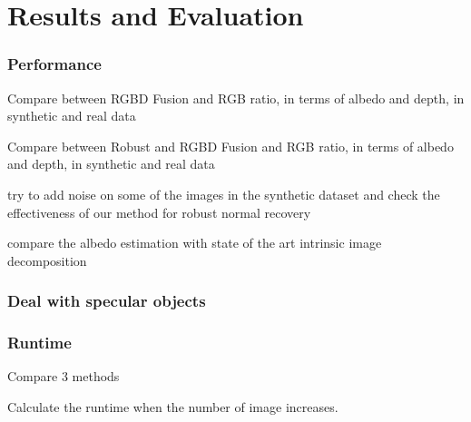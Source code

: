 \chapter{Results and Evaluation} \label{chap:result}


\subsection{Performance}
Compare between RGBD Fusion and RGB ratio, in terms of albedo and depth, in synthetic and real data

Compare between Robust and RGBD Fusion and RGB ratio, in terms of albedo and depth, in synthetic and real data

try to add noise on some of the images in the synthetic dataset and check the effectiveness of our method for robust normal recovery

compare the albedo estimation with state of the art intrinsic image decomposition
\subsection{Deal with specular objects}

\subsection{Runtime}
Compare 3 methods

Calculate the runtime when the number of image increases.


